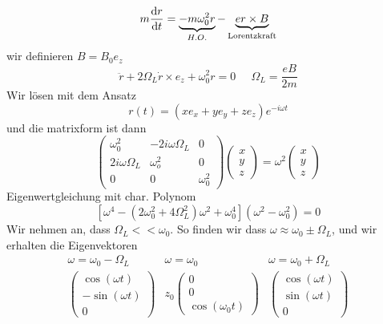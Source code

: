 \documentclass[]{scrbook}
\begin{document}
$$
m\frac{\text dr}{\text dt} = \underbrace{-m\omega_0^2 r}_{H.O.} - \underbrace{er\times B}_{\text{Lorentzkraft}}
$$
wir definieren $B = B_0 e_z$
\begin{equation}
	\ddot r + 2\Omega_L \dot r \times e_z + \omega_0^2 r = 0\;\;\;\;\; \Omega_L = \frac{eB}{2m}
\end{equation}
Wir lösen mit dem Ansatz
\begin{equation}
	r(t) = (xe_x + ye_y + ze_z) e^{-i\omega t}
\end{equation}
und die matrixform ist dann
\begin{equation}
	\begin{pmatrix}
		\omega_0^2 & -2i\omega\Omega_L & 0\\
		2i\omega\Omega_L & \omega_o^2 & 0\\
		0 & 0 & \omega_0^2
	\end{pmatrix}
	\begin{pmatrix}
		x \\ y \\ z
	\end{pmatrix}
	= \omega^2
	\begin{pmatrix}
		x \\ y\\ z
	\end{pmatrix}
\end{equation}
Eigenwertgleichung mit char. Polynom
\begin{equation}
	\left[\omega^4 - (2\omega_0^2 + 4\Omega_L^2)\omega^2 + \omega_0^4\right](\omega^2 - \omega_0^2) = 0
\end{equation}
Wir nehmen an, dass $\Omega_L << \omega_0$. So finden wir dass $\omega \approx \omega_0 \pm \Omega_L$, und wir erhalten die Eigenvektoren
\begin{equation}
	\begin{matrix}
		\omega = \omega_0 - \Omega_L & \omega=\omega_0 & \omega = \omega_0+\Omega_L\\
		\begin{pmatrix}
			\cos(\omega t)\\
			-\sin(\omega t)\\
			0
		\end{pmatrix}		

		& z_0
		\begin{pmatrix}
			0 \\ 0 \\ \cos(\omega_0 t)
		\end{pmatrix}
		&
		\begin{pmatrix}
			\cos(\omega t)\\
			\sin (\omega t)\\
			0
		\end{pmatrix}
	\end{matrix}
\end{equation}
\end{document}
